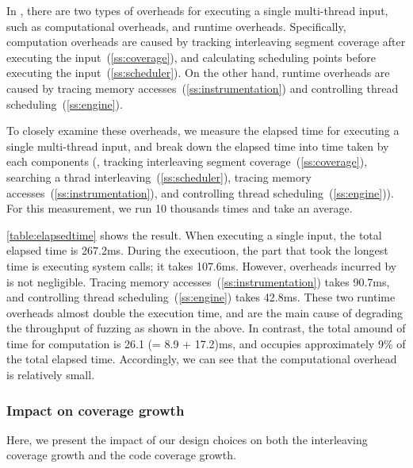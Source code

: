 %
\begin{table}[t]
  \centering
  
  \caption{
    Elapsed time (ms) for executing one multi-thread input. We
    decompose the elapsed time into the system call execution
    (\texttt{Exec. syscall}), \sys's computational overheads
    (\texttt{Comp. overhead}) and runtime overhead (\texttt{Runtime
      overhead}).}
  \label{table:elapsedtime}
\end{table}
%
In \sys, there are two types of overheads for executing a single
multi-thread input, such as computational overheads, and runtime
overheads.
%
Specifically, computation overheads are caused by tracking
interleaving segment coverage after executing the
input~(\autoref{ss:coverage}), and calculating scheduling points
before executing the input~(\autoref{ss:scheduler}).
%
On the other hand, runtime overheads are caused by tracing memory
accesses~(\autoref{ss:instrumentation}) and controlling thread
scheduling~(\autoref{ss:engine}).


To closely examine these overheads, we measure the elapsed time for
executing a single multi-thread input, and break down the elapsed time
into time taken by each components (\ie, tracking interleaving segment
coverage~(\autoref{ss:coverage}), searching a thrad
interleaving~(\autoref{ss:scheduler}), tracing memory
accesses~(\autoref{ss:instrumentation}), and controlling thread
scheduling~(\autoref{ss:engine})).
%
For this measurement, we run 10 thousands times and take an average.




\autoref{table:elapsedtime} shows the result. When executing a single
input, the total elapsed time is 267.2ms.
%
During the executioon, the part that took the longest time is
executing system calls; it takes 107.6ms.
%
However, overheads incurred by \sys is not negligible. Tracing memory
accesses~(\autoref{ss:instrumentation}) takes 90.7ms, and controlling
thread scheduling~(\autoref{ss:engine}) takes 42.8ms. These two
runtime overheads almost double the execution time, and are the main
cause of degrading the throughput of fuzzing as shown in the above.
%
In contrast, the total amound of time for computation is 26.1 (= 8.9 +
17.2)ms, and occupies approximately 9\% of the total elapsed time.
%
Accordingly, we can see that the computational overhead is relatively
small.



\subsubsection{Impact on coverage growth}
\label{sss:component}
%
Here, we present the impact of our design choices on both the
interleaving coverage growth and the code coverage growth.


